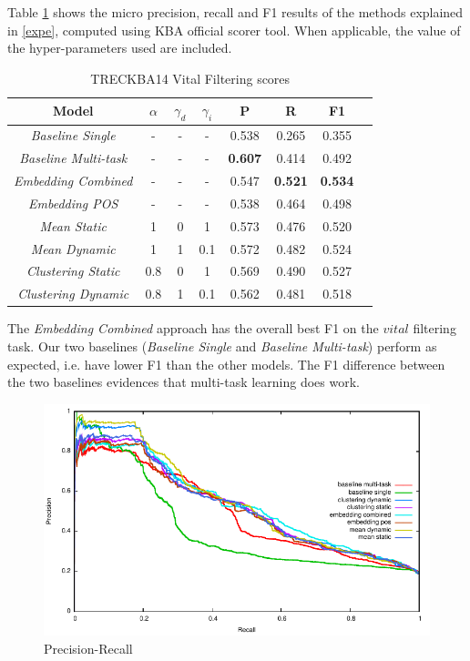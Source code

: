 \documentclass{article}
\begin{document}
Table \ref{res} shows the micro precision, recall and F1 results of the methods explained in \ref{expe}, computed using KBA official scorer tool. When applicable, the value of the hyper-parameters used are included.

\begin{table}[H]
\center
\begin{tabular}{|c|c|c|c|c|c|c|c|} \hline
\textbf{Model} & \textbf{$\alpha$} & \textbf{$\gamma_d$} & \textbf{$\gamma_i$} & \textbf{P} & \textbf{R} & \textbf{F1} \\ \hline\hline
{\textit{Baseline Single}} & - & - & - & 0.538 & 0.265 & 0.355 \\ \hline
{\textit{Baseline Multi-task}} & - & - & - & \textbf{0.607} & 0.414 & 0.492 \\ \hline
{\textit{Embedding Combined}} & - & - & - & 0.547 & \textbf{0.521} & \textbf{0.534} \\ \hline
{\textit{Embedding POS}} & - & - & - & 0.538 & 0.464 & 0.498 \\ \hline
{\textit{Mean Static}} & 1 & 0 & 1 & 0.573 & 0.476 & 0.520 \\ \hline
{\textit{Mean Dynamic}} & 1 & 1 & 0.1 & 0.572 & 0.482 & 0.524 \\ \hline
{\textit{Clustering Static}} & 0.8 & 0 & 1 & 0.569 & 0.490 & 0.527 \\ \hline
{\textit{Clustering Dynamic}} & 0.8 & 1 & 0.1 & 0.562 & 0.481 & 0.518 \\ \hline
\end{tabular}
\caption{TRECKBA14 Vital Filtering scores}
\label{res}
\end{table}

The {\textit{Embedding Combined}} approach has the overall best F1 on the $vital$ filtering task. Our two baselines ({\textit{Baseline Single}} and {\textit{Baseline Multi-task}}) perform as expected, i.e. have lower F1 than the other models. The F1 difference between the two baselines evidences that multi-task learning does work.

\begin{figure}[h!]
\centering
\includegraphics[width=.5\textwidth]{overlapped.pdf}
\caption{Precision-Recall}
\label{precrecall}
\end{figure}
\end{document}
